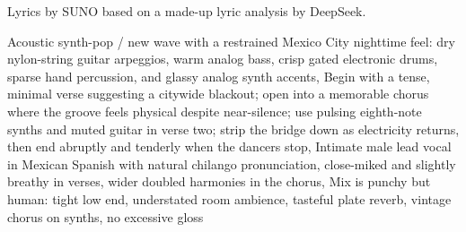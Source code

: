 
\begin{notes}
Lyrics by SUNO based on a made-up lyric analysis by DeepSeek.
\end{notes}
\begin{style}
Acoustic synth-pop / new wave with a restrained Mexico City nighttime feel: dry nylon-string guitar arpeggios, warm analog bass, crisp gated electronic drums, sparse hand percussion, and glassy analog synth accents, Begin with a tense, minimal verse suggesting a citywide blackout; open into a memorable chorus where the groove feels physical despite near-silence; use pulsing eighth-note synths and muted guitar in verse two; strip the bridge down as electricity returns, then end abruptly and tenderly when the dancers stop, Intimate male lead vocal in Mexican Spanish with natural chilango pronunciation, close-miked and slightly breathy in verses, wider doubled harmonies in the chorus, Mix is punchy but human: tight low end, understated room ambience, tasteful plate reverb, vintage chorus on synths, no excessive gloss
\end{style}
